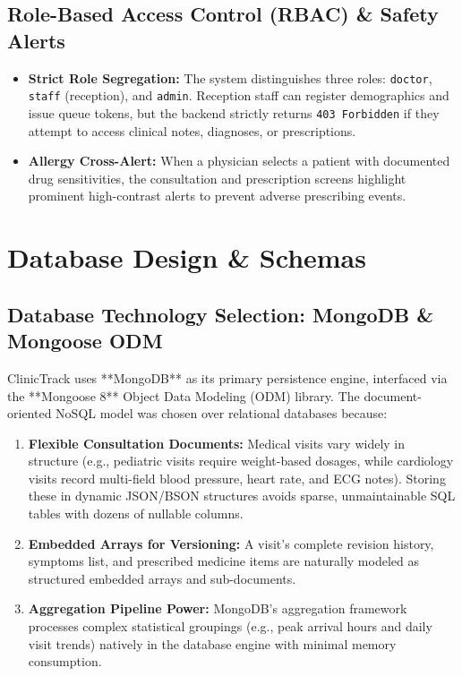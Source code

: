 \documentclass[12pt,a4paper,oneside]{report}
\begin{document}
\section{Role-Based Access Control (RBAC) \& Safety Alerts}
\begin{itemize}
    \item \textbf{Strict Role Segregation:} The system distinguishes three roles: \texttt{doctor}, \texttt{staff} (reception), and \texttt{admin}. Reception staff can register demographics and issue queue tokens, but the backend strictly returns \texttt{403 Forbidden} if they attempt to access clinical notes, diagnoses, or prescriptions.
    \item \textbf{Allergy Cross-Alert:} When a physician selects a patient with documented drug sensitivities, the consultation and prescription screens highlight prominent high-contrast alerts to prevent adverse prescribing events.
\end{itemize}

\chapter{Database Design \& Schemas}
\label{chap:database}

\section{Database Technology Selection: MongoDB \& Mongoose ODM}
ClinicTrack uses **MongoDB** as its primary persistence engine, interfaced via the **Mongoose 8** Object Data Modeling (ODM) library. The document-oriented NoSQL model was chosen over relational databases because:
\begin{enumerate}
    \item \textbf{Flexible Consultation Documents:} Medical visits vary widely in structure (e.g., pediatric visits require weight-based dosages, while cardiology visits record multi-field blood pressure, heart rate, and ECG notes). Storing these in dynamic JSON/BSON structures avoids sparse, unmaintainable SQL tables with dozens of nullable columns.
    \item \textbf{Embedded Arrays for Versioning:} A visit's complete revision history, symptoms list, and prescribed medicine items are naturally modeled as structured embedded arrays and sub-documents.
    \item \textbf{Aggregation Pipeline Power:} MongoDB's aggregation framework processes complex statistical groupings (e.g., peak arrival hours and daily visit trends) natively in the database engine with minimal memory consumption.
\end{enumerate}
\end{document}
